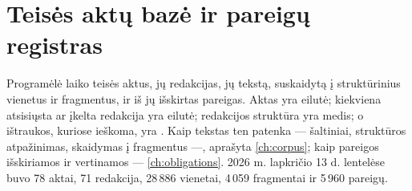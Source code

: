 \section{Teisės aktų bazė ir pareigų registras}\label{sec:data:corpus}

Programėlė  laiko teisės aktus, jų redakcijas, jų tekstą, suskaidytą į
struktūrinius vienetus ir fragmentus, ir iš jų išskirtas pareigas. Aktas yra
 eilutė; kiekviena atsisiųsta ar įkelta redakcija yra
 eilutė; redakcijos struktūra yra  medis; o
ištraukos, kuriose ieškoma, yra . Kaip tekstas ten patenka --- šaltiniai,
struktūros atpažinimas, skaidymas į fragmentus ---, aprašyta \cref{ch:corpus}; kaip pareigos
išskiriamos ir vertinamos --- \cref{ch:obligations}. 2026 m. lapkričio 13 d. lentelėse buvo 78
aktai, 71 redakcija, 28\,886 vienetai, 4\,059 fragmentai ir 5\,960 pareigų.

